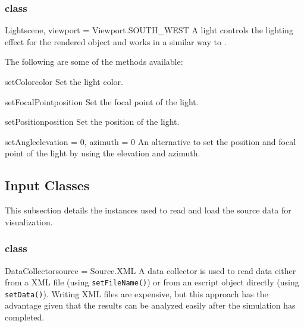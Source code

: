 \subsubsection{\Light class}

\begin{classdesc}{Light}{scene, viewport = Viewport.SOUTH_WEST}
A light controls the lighting effect for the rendered object and works in 
a similar way to \Camera.
\end{classdesc}

The following are some of the methods available:
\begin{methoddesc}[Light]{setColor}{color}
Set the light color.
\end{methoddesc}

\begin{methoddesc}[Light]{setFocalPoint}{position}
Set the focal point of the light.
\end{methoddesc}

\begin{methoddesc}[Light]{setPosition}{position}
Set the position of the light.
\end{methoddesc}

\begin{methoddesc}[Light]{setAngle}{elevation = 0, azimuth = 0}
An alternative to set the position and focal point of the light by using the 
elevation and azimuth.
\end{methoddesc}




\subsection{Input Classes}
\label{INPUT SEC}
This subsection details the instances used to read and load the source data
for visualization.

\subsubsection{\DataCollector class}
\begin{classdesc}{DataCollector}{source = Source.XML}
A data collector is used to read data either from a XML file (using 
\texttt{setFileName()}) or from an escript object directly (using 
\texttt{setData()}). Writing XML files are expensive, but this approach has 
the advantage given that the results can be analyzed easily after the 
simulation has completed.   
\end{classdesc}

